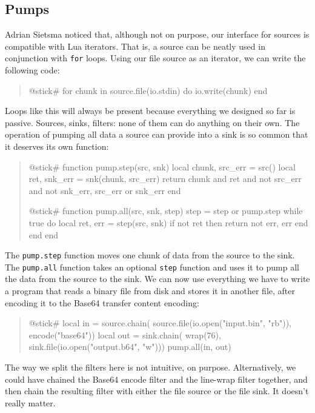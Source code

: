 \documentclass[10pt]{article}
\begin{document}
\subsection{Pumps}

Adrian Sietsma noticed that, although not on purpose, our 
interface for sources is compatible with Lua iterators. 
That is, a source can be neatly used in conjunction 
with \texttt{for} loops.  Using our file
source as an iterator, we can write the following code:
\begin{quote}
\begin{lua}
@stick#
for chunk in source.file(io.stdin) do
  io.write(chunk)
end
%
\end{lua}
\end{quote}

Loops like this will always be present because everything 
we designed so far is passive. Sources, sinks, filters: none
of them can do anything on their own. The operation of
pumping all data a source can provide into a sink is so
common that it deserves its own function:
\begin{quote}
\begin{lua}
@stick#
function pump.step(src, snk)
  local chunk, src_err = src()
  local ret, snk_err = snk(chunk, src_err)
  return chunk and ret and not src_err and not snk_err, 
    src_err or snk_err
end
%

@stick#
function pump.all(src, snk, step)
  step = step or pump.step
  while true do
    local ret, err = step(src, snk)
    if not ret then return not err, err end
  end
end
%
\end{lua}
\end{quote}

The \texttt{pump.step} function moves one chunk of data from
the source to the sink. The \texttt{pump.all} function takes
an optional \texttt{step} function and uses it to pump all the
data from the source to the sink. We can now use everything
we have to write a program that reads a binary file from
disk and stores it in another file, after encoding it to the
Base64 transfer content encoding:
\begin{quote}
\begin{lua}
@stick#
local in = source.chain(
  source.file(io.open("input.bin", "rb")), 
  encode("base64"))
local out = sink.chain(
  wrap(76),
  sink.file(io.open("output.b64", "w")))
pump.all(in, out)
%
\end{lua}
\end{quote}

The way we split the filters here is not intuitive, on
purpose.  Alternatively, we could have chained the Base64
encode filter and the line-wrap filter together, and then
chain the resulting filter with either the file source or
the file sink. It doesn't really matter.
\end{document}
